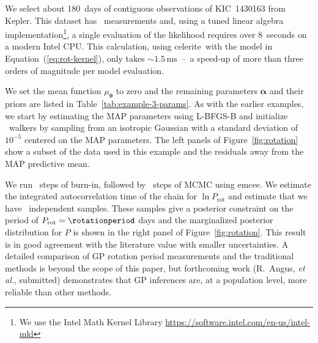 \documentclass[manuscript, letterpaper]{aastex6}
\newcommand{\project}[1]{\textsf{#1}}
\newcommand{\kepler}{\project{Kepler}}
\newcommand{\celerite}{\project{celerite}}
\newcommand{\emcee}{\project{emcee}}
\newcommand{\foreign}[1]{\emph{#1}}
\newcommand{\etal}{\foreign{et\,al.}}
\newcommand{\figureref}[1]{\ref{fig:#1}}
\newcommand{\Figure}[1]{Figure~\figureref{#1}}
\renewcommand{\eqref}[1]{\ref{eq:#1}}
\newcommand{\Eq}[1]{Equation~(\eqref{#1})}
\newcommand{\eq}[1]{\Eq{#1}}
\newcommand{\bvec}[1]{{\ensuremath{\boldsymbol{#1}}}}
\newcommand{\response}[1]{{\color{blue}#1}}
\begin{document}
\response{We select about 180~days of contiguous observations of
KIC~1430163 from \kepler.
This dataset has \exampleiiindata\ measurements and, using a tuned linear
algebra
implementation\footnote{We use the Intel Math Kernel Library
\url{https://software.intel.com/en-us/intel-mkl}}, a
single evaluation of the likelihood requires over 8~seconds on a modern Intel
CPU.
This calculation, using \celerite\ with the model in \eq{rot-kernel}, only
takes $\sim 1.5\,\mathrm{ms}$~--~a speed-up of more than three orders of
magnitude per model evaluation. %

We set the mean function $\mu_\bvec{\theta}$ to zero and the remaining
parameters $\bvec{\alpha}$ and their priors are listed in
Table~\ref{tab:example-3-params}.
As with the earlier examples, we start by estimating the MAP parameters using
\project{L-BFGS-B} and initialize \exampleiiinwalkers~walkers by sampling from
an isotropic Gaussian with a standard deviation of $10^{-5}$ centered on the
MAP parameters.
The left panels of \Figure{rotation} show a subset of the data used in this
example and the residuals away from the MAP predictive mean.

We run \exampleiiinburn~steps of burn-in, followed by \exampleiiinsteps~steps
of MCMC using \emcee.
We estimate the integrated autocorrelation time of the chain for $\ln
P_\mathrm{rot}$ and estimate that we have \exampleiiineff\ independent
samples.
These samples give a posterior constraint on the period of $P_\mathrm{rot} =
\rotationperiod$ days and the marginalized posterior distribution for $P$ is shown
in the right panel of \Figure{rotation}.
This result is in good agreement with the literature value with smaller
uncertainties.
A detailed comparison of GP rotation period measurements and the traditional
methods is beyond the scope of this paper, but forthcoming work (R.~Angus,
\etal, submitted) demonstrates that GP inferences are, at a population level,
more reliable than other methods.
}


\end{document}
